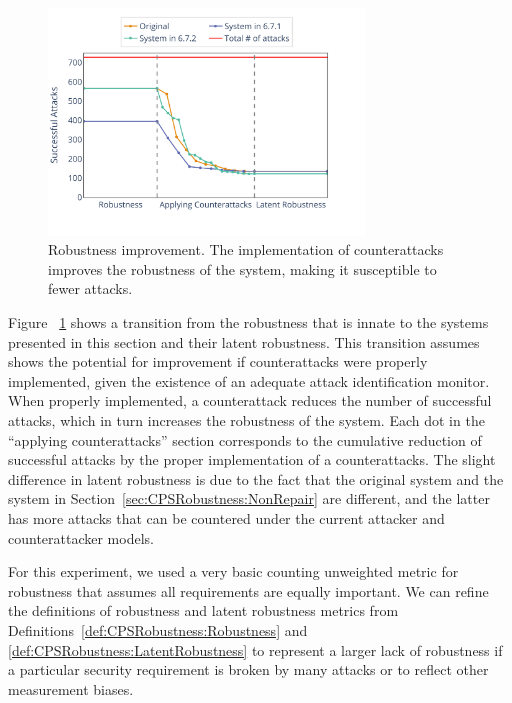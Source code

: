 {\begin{figure}[t]
  \centering
  \includegraphics[width=0.75\textwidth]{Figures/Robustness.pdf} 
  \caption{Robustness improvement. The implementation of counterattacks improves the robustness of the system, making it susceptible to fewer attacks.}
  \label{fig:CPSRobustness:Robustness}
\end{figure}
Figure ~\ref{fig:CPSRobustness:Robustness} shows a transition from the robustness that is innate to the systems presented in this section and their latent robustness. This transition assumes shows the potential for improvement if counterattacks were properly implemented, given the existence of an adequate attack identification monitor. When properly implemented, a counterattack reduces the number of successful attacks, which in turn increases the robustness of the system. Each dot in the ``applying counterattacks'' section corresponds to the cumulative reduction of successful attacks by the proper implementation of a counterattacks. %
The slight difference in latent robustness is due to the fact that the original system and the system in Section~\ref{sec:CPSRobustness:NonRepair} are different, and the latter has more attacks that can be countered under the current attacker and counterattacker models. 

For this experiment, we used a very basic counting unweighted metric for robustness that assumes all requirements are equally important. We can refine the definitions of robustness and latent robustness metrics from Definitions~\ref{def:CPSRobustness:Robustness} and \ref{def:CPSRobustness:LatentRobustness} to represent a larger lack of robustness if a particular security requirement is broken by many attacks or to reflect other measurement biases. 

}

